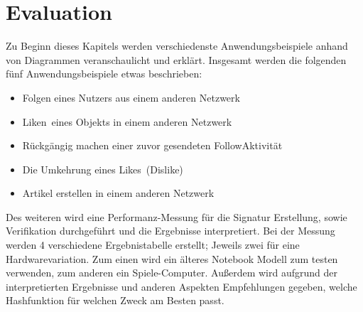 
\chapter{Evaluation}
\label{ch:Evaluation}
Zu Beginn dieses Kapitels werden verschiedenste Anwendungsbeispiele anhand von Diagrammen veranschaulicht und erklärt. Insgesamt werden die folgenden fünf Anwendungsbeispiele etwas beschrieben:
\begin{itemize}
	\item Folgen eines Nutzers aus einem anderen Netzwerk
	\item \glqq Liken\grqq~eines Objekts in einem anderen Netzwerk
	\item Rückgängig machen einer zuvor gesendeten \glqq Follow\grqq Aktivität
	\item Die Umkehrung eines \glqq Likes\grqq~(Dislike)
	\item Artikel erstellen in einem anderen Netzwerk
\end{itemize}
Des weiteren wird eine Performanz-Messung für die Signatur Erstellung, sowie Verifikation durchgeführt und die Ergebnisse interpretiert. Bei der Messung werden 4 verschiedene Ergebnistabelle erstellt; Jeweils zwei für eine Hardwarevariation. Zum einen wird ein älteres Notebook Modell zum testen verwenden, zum anderen ein Spiele-Computer. Außerdem wird aufgrund der interpretierten Ergebnisse und anderen Aspekten Empfehlungen gegeben, welche Hashfunktion für welchen Zweck am Besten passt.

